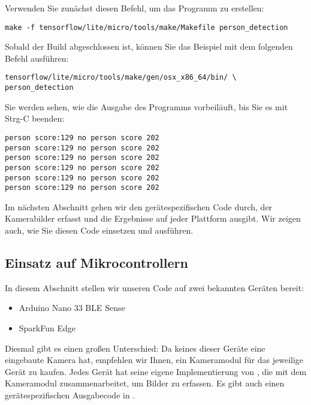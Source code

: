 Verwenden Sie zunächst diesen Befehl, um das Programm zu erstellen:

\begin{code}
    \begin{lstlisting}
make -f tensorflow/lite/micro/tools/make/Makefile person_detection
  \end{lstlisting}
\end{code}

Sobald der Build abgeschlossen ist, können Sie das Beispiel mit dem folgenden Befehl ausführen:

\begin{code}
    \begin{lstlisting}
tensorflow/lite/micro/tools/make/gen/osx_x86_64/bin/ \
person_detection
  \end{lstlisting}
\end{code}

Sie werden sehen, wie die Ausgabe des Programms vorbeiläuft, bis Sie es mit Strg-C beenden:

\begin{code}
    \begin{lstlisting}
person score:129 no person score 202
person score:129 no person score 202
person score:129 no person score 202
person score:129 no person score 202
person score:129 no person score 202
person score:129 no person score 202
  \end{lstlisting}
\end{code}

Im nächsten Abschnitt gehen wir den gerätespezifischen Code durch, der Kamerabilder erfasst und die Ergebnisse auf jeder Plattform ausgibt. Wir zeigen auch, wie Sie diesen Code einsetzen und ausführen.

\subsection{Einsatz auf Mikrocontrollern}

In diesem Abschnitt stellen wir unseren Code auf zwei bekannten Geräten bereit:

\begin{itemize}
    \item  Arduino Nano 33 BLE Sense
    \item SparkFun Edge
\end{itemize}

Diesmal gibt es einen großen Unterschied: Da keines dieser Geräte eine eingebaute Kamera hat, empfehlen wir Ihnen, ein Kameramodul für das jeweilige Gerät zu kaufen. Jedes Gerät hat seine eigene Implementierung von , die mit dem Kameramodul zusammenarbeitet, um Bilder zu erfassen. Es gibt auch einen gerätespezifischen Ausgabecode in .

